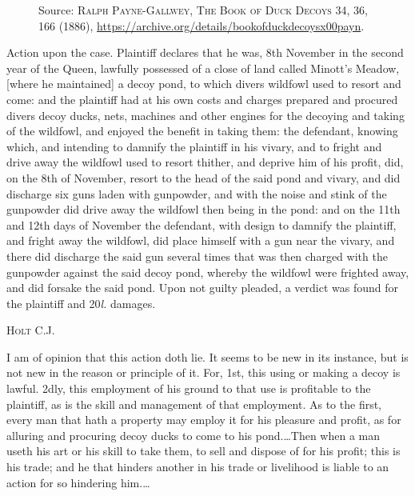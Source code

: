 

\begin{figure}
\begin{center}
\end{center}
\caption{Source: \textsc{Ralph Payne-Gallwey, The Book of Duck Decoys} 34, 36,
166 (1886),
\protect\url{https://archive.org/details/bookofduckdecoysx00payn}.}
\end{figure}

Action upon the case. Plaintiff declares that he was, 8th November in the second
year of the Queen, lawfully possessed of a close of land called Minott's Meadow,
[where he maintained] a decoy pond, to which divers wildfowl used to resort and
come: and the plaintiff had at his own costs and charges prepared and procured
divers decoy ducks, nets, machines and other engines for the decoying and taking
of the wildfowl, and enjoyed the benefit in taking them: the defendant, knowing
which, and intending to damnify the plaintiff in his vivary, and to fright and
drive away the wildfowl used to resort thither, and deprive him of his profit,
did, on the 8th of November, resort to the head of the said pond and vivary, and
did discharge six guns laden with gunpowder, and with the noise and stink of the
gunpowder did drive away the wildfowl then being in the pond: and on the 11th
and 12th days of November the defendant, with design to damnify the plaintiff,
and fright away the wildfowl, did place himself with a gun near the vivary, and
there did discharge the said gun several times that was then charged with the
gunpowder against the said decoy pond, whereby the wildfowl were frighted away,
and did forsake the said pond. Upon not guilty pleaded, a verdict was found for
the plaintiff and 20\textit{l.} damages. 

\opinion \textsc{Holt C.J.} 

I am of opinion that this action doth lie. It seems to be new in its instance,
but is not new in the reason or principle of it. For, 1st, this using or making
a decoy is lawful. 2dly, this employment of his ground to that use is profitable
to the plaintiff, as is the skill and management of that employment. As to the
first, every man that hath a property may employ it for his pleasure and profit,
as for alluring and procuring decoy ducks to come to his pond.\ldots Then when a
man useth his art or his skill to take them, to sell and dispose of for his
profit; this is his trade; and he that hinders another in his trade or
livelihood is liable to an action for so hindering him.\ldots 

